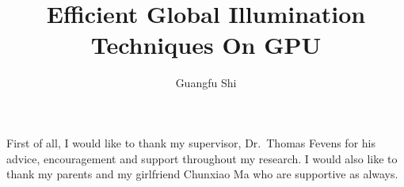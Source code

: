 \documentclass[12pt]{report}
\author{Guangfu Shi}
\title{Efficient Global Illumination Techniques On GPU}
\begin{document}
 


\begin{acknowledgments}
First of all, I would like to thank my supervisor, Dr.~Thomas Fevens for his advice, encouragement and support throughout my research. I would also like to thank my parents and my girlfriend Chunxiao Ma who are supportive as always.
\end{acknowledgments}


\setcounter{page}{1}

\begin{spacing}{2.0}
	








	

		

%				

 


\end{spacing}
\end{document}

